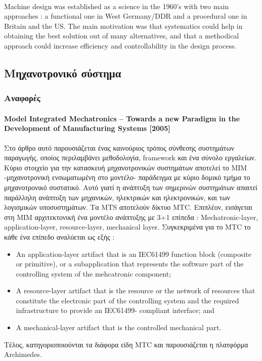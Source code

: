 \documentclass[a4paper,12pt,twoside]{report}
\begin{document}
{			\paragraph{}{Machine design was established as a science in the 1960's with two main approaches : a functional one in West Germany/DDR and a procedural one in Britain and the US. The main motivation was that systematics could help in obtaining the best solution out of many alternatives, and that a methodical approach could increase efficiency and controllability in the design process.
			}
		
		\subsection{Μηχανοτρονικό σύστημα}
			\subsubsection{Αναφορές}	
				
				\paragraph{Model Integrated Mechatronics – Towards a new Paradigm in the Development of Manufacturing Systems [2005]}{Στο άρθρο αυτό παρουσιάζεται ένας καινούριος τρόπος σύνθεσης συστημάτων παραγωγής, οποίος περιλαμβάνει μεθοδολογία, framework και ένα σύνολο εργαλείων. Κύριο στοιχείο για την κατασκευή μηχανοτρονικών συστημάτων αποτελεί το MIM -μηχανοτρονική ενσωματωμένη στο μοντέλο- παράδειγμα  με κύριο δομικό τμήμα το μηχανοτρονικό συστατικό. Αυτό γιατί η ανάπτυξη των σημερινών συστημάτων απαιτεί παράλληλη ανάπτυξη των μηχανικών, ηλεκτρικών και ηλεκτρονικών, και των λογισμικών υποσυστημάτων. Τα MTS αποτελούν δίκτυο MTC. Επιπλέον, εισάγεται στη MIM αρχιτεκτονική ένα μοντέλο ανάπτυξης με 3+1 επίπεδα : Mechatronic-layer, application-layer, resource-layer, mechanical layer. Συγκεκριμένα για το MTC το κάθε ένα επίπεδο αναλύεται ως εξής :
				\begin{itemize}				
					\item An application-layer artifact that is an IEC61499 function block (composite or primitive), or a subapplication
that represents the software part of the controlling system of the mehcatronic
component;
					\item A resource-layer artifact that is the resource or the network of resources that constitute the
electronic part of the controlling system and the required infrastructure to provide an IEC61499-
compliant interface; and
					\item A mechanical-layer artifact that is the controlled mechanical part.
				\end{itemize}
Τέλος, κατηγοριοποιούνται τα διάφορα είδη MTC και παρουσιάζεται η πλατφόρμα Archimedes. \cite{ModelIntegratedMechatronics:Thramboulidis2005}
				}
				
}
\end{document}
